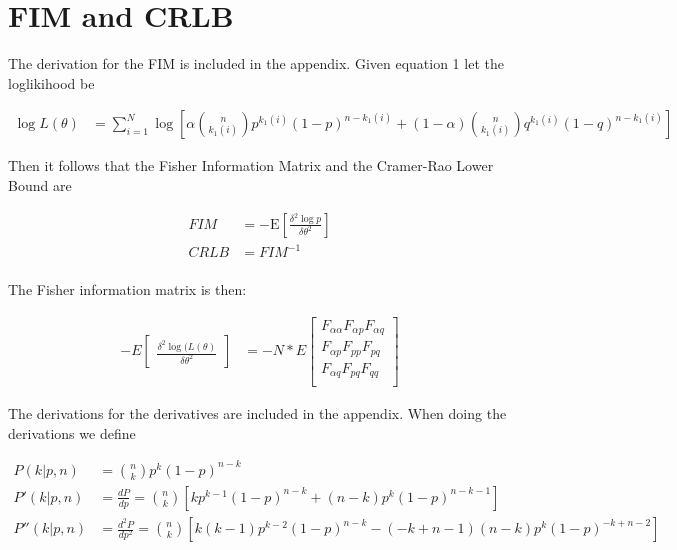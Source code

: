 \section{FIM and CRLB}

The derivation for the FIM is included in the appendix. Given equation 1 let the loglikihood be

\begin{align*}
\log L(\mathbb{\theta}) &= \sum_{i=1}^{N} \log \left[ \alpha \binom{n}{k_1(i)} p^{k_1(i)} (1-p)^{n - k_1(i)} + (1-\alpha) \binom{n}{k_1(i)} q^{k_1(i)} (1-q)^{n - k_1(i)}  \right] 
\end{align*}

Then it follows that the Fisher Information Matrix and the Cramer-Rao Lower Bound are

\begin{align*}
FIM &= -\mathrm{E} \left[\frac{\delta^2 \log p}{\delta\mathbb{\theta}^2}\right] \\
CRLB &= FIM^{-1} \\
\end{align*}

The Fisher information matrix is then:

\begin{align*}
-E\begin{bmatrix}\frac{\delta^2\log(L(\mathbb{\theta})}{{\delta\theta}^2}\end{bmatrix} &= -N * E\begin{bmatrix}
F_{\alpha\alpha} F_{\alpha p} F_{\alpha q} \\
F_{\alpha p} F_{pp} F_{pq} \\
F_{\alpha q} F_{pq} F_{qq} \\
\end{bmatrix}
\end{align*}

The derivations for the derivatives are included in the appendix. When doing the derivations we define

\begin{align*}
P(k | p, n) &= \binom{n}{k}p^{k}(1 - p)^{n - k} \\
P'(k | p, n) &= \frac{dP}{dp} = \binom{n}{k}\left[kp^{k - 1}(1 - p)^{n - k} + (n - k)p^{k}(1 - p)^{n - k - 1}\right]\\
P''(k | p, n) &= \frac{d^2P}{dp^2} = \binom{n}{k}\left[k(k - 1)p^{k - 2}(1 - p)^{n - k} - (-k + n - 1)(n - k)p^k(1 - p)^{-k + n - 2} \right]\\
\end{align*}

